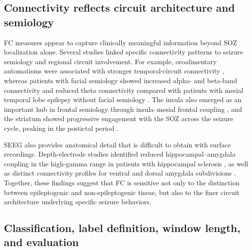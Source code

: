 \documentclass[12pt]{article}
\begin{document}
\subsection{Connectivity reflects circuit architecture and semiology}
FC measures appear to capture clinically meaningful information beyond SOZ localization alone. Several studies linked specific connectivity patterns to seizure semiology and regional circuit involvement. For example, oroalimentary automatisms were associated with stronger temporal-circuit connectivity \cite{Aupy2018-au, Wang2019-jl}, whereas patients with facial semiology showed increased alpha- and beta-band connectivity and reduced theta connectivity compared with patients with mesial temporal lobe epilepsy without facial semiology \cite{Wang2021-iw}. The insula also emerged as an important hub in frontal semiology through insula--mesial frontal coupling \cite{Hagiwara2017-sz}, and the striatum showed progressive engagement with the SOZ across the seizure cycle, peaking in the postictal period \cite{Aupy2019-je, Chibany2025-ob}.

SEEG also provides anatomical detail that is difficult to obtain with surface recordings. Depth-electrode studies identified reduced hippocampal--amygdala coupling in the high-gamma range in patients with hippocampal sclerosis \cite{Mo2021-ig}, as well as distinct connectivity profiles for ventral and dorsal amygdala subdivisions \cite{Aung2025-gz}. Together, these findings suggest that FC is sensitive not only to the distinction between epileptogenic and non-epileptogenic tissue, but also to the finer circuit architecture underlying specific seizure behaviors.


\subsection{Classification, label definition, window length, and evaluation}
\end{document}
